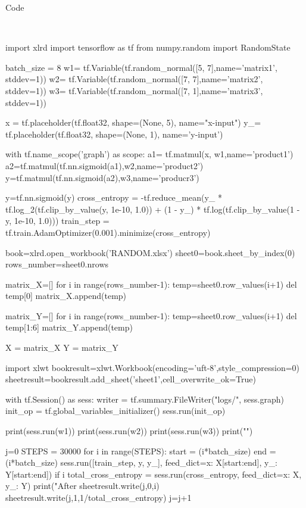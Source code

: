 \documentclass{article}
\begin{document}
\begin{spacing}{2}
    \begin{center}
        Code
    \end{center}\\

\begin{python}
import xlrd
import tensorflow as tf
from numpy.random import RandomState

batch_size = 8
w1= tf.Variable(tf.random_normal([5, 7],name='matrix1', stddev=1))
w2= tf.Variable(tf.random_normal([7, 7],name='matrix2', stddev=1))
w3= tf.Variable(tf.random_normal([7, 1],name='matrix3', stddev=1))
        
x = tf.placeholder(tf.float32, shape=(None, 5), name="x-input")
y_= tf.placeholder(tf.float32, shape=(None, 1), name='y-input')

with tf.name_scope('graph') as scope:
    a1= tf.matmul(x, w1,name='product1')
    a2=tf.matmul(tf.nn.sigmoid(a1),w2,name='product2')
    y=tf.matmul(tf.nn.sigmoid(a2),w3,name='producr3')

    y=tf.nn.sigmoid(y)
    cross_entropy = -tf.reduce_mean(y_ * tf.log_2(tf.clip_by_value(y, 1e-10, 1.0))
    + (1 - y_) * tf.log(tf.clip_by_value(1 - y, 1e-10, 1.0)))
    train_step = tf.train.AdamOptimizer(0.001).minimize(cross_entropy)

book=xlrd.open_workbook('RANDOM.xlsx')
sheet0=book.sheet_by_index(0)
rows_number=sheet0.nrows

matrix_X=[]
for i in range(rows_number-1):
    temp=sheet0.row_values(i+1)
    del temp[0]
    matrix_X.append(temp)

matrix_Y=[]
for i in range(rows_number-1):
    temp=sheet0.row_values(i+1)
    del temp[1:6]
    matrix_Y.append(temp)

X = matrix_X
Y = matrix_Y

import xlwt
bookresult=xlwt.Workbook(encoding='uft-8',style_compression=0)
sheetresult=bookresult.add_sheet('sheet1',cell_overwrite_ok=True)

with tf.Session() as sess:
    writer = tf.summary.FileWriter("logs/", sess.graph)
    init_op = tf.global_variables_initializer()
    sess.run(init_op)
    
    print(sess.run(w1))
    print(sess.run(w2))
    print(sess.run(w3))   
    print("\n")
    
    j=0
    STEPS = 30000
    for i in range(STEPS):
        start = (i*batch_size) %
        end = (i*batch_size) %
        sess.run([train_step, y, y_], feed_dict={x: X[start:end], y_: Y[start:end]})
        if i %
            total_cross_entropy = sess.run(cross_entropy, feed_dict={x: X, y_: Y})
            print("After %
            sheetresult.write(j,0,i)
            sheetresult.write(j,1,1/total_cross_entropy)
            j=j+1


\end{python}
\end{spacing}
\end{document}
